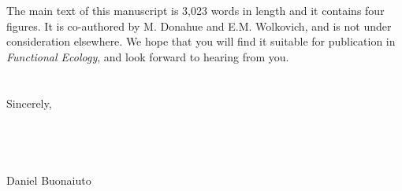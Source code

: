 \documentclass[11.5 pt]{article}
\begin{document}
\noindent The main text of this manuscript is 3,023 words in length and it contains four figures. It is co-authored by M. Donahue and E.M. Wolkovich, and is not under consideration elsewhere. We hope that you will find it suitable for publication in \textit{Functional Ecology}, and look forward to hearing from you.\\\\ 
\\Sincerely,\\\\\\\\\\

\noindent Daniel Buonaiuto\\


\end{document}
